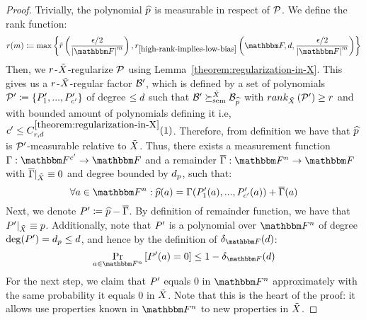 \begin{proof}
    Trivially, the polynomial $\lift{\onvarpoly}$ is measurable in respect of $\genpolyset$.
    \newline
    We define the rank function:
    \[
        \rankfunc(m) \definedas \max \set{
            \rankbiasfunc \parens {\dfrac{\epsilon / 2}{\abs{\basefield}^m}},
            \rankfunc_{\ref{high-rank-implies-low-bias}} \parens{\basefield, \degree, \dfrac{\epsilon / 2}{\abs{\basefield}^m}}}
    \]
    Then, we ${{{r}}}$-${\tilde{X}}$-regularize $\genpolyset$ using Lemma~{\ref{theorem:regularization-in-X}}.
    This gives us a ${{{r}}}$-${\tilde{X}}$-regular factor $\mathcal{B}^\prime$, which is defined by a set of polynomials $\genpolyset^{\prime} \definedas \set{\genpoly^\prime_1,...,\genpoly^\prime_{c^\prime}}$
    of degree $\leq d$ such that $\factor^\prime \relsemrefine{\variety}\factor_{\lift{\onvarpoly}}$ with $\relrank{\variety}{\genpolyset^\prime} \geq \rankfunc$
    and with bounded amount of polynomials defining it i.e,$c^\prime \leq C_{{{{r}}}, d}^{\ref{theorem:regularization-in-X}}(1)$.
    Therefore, from definition we have that $\lift{\onvarpoly}$ is $\genpolyset^\prime$-measurable relative to ${\tilde{X}}$.
    Thus, there exists a measurement function $\funcdef{\Gamma}{\basefield^{c^\prime}}{\basefield}$
    and a remainder $\funcdef{\relativeremainder{\Gamma}}{\field}{\basefield}$ with $\overline{\Gamma}|_{{\tilde{X}}} \equiv 0$
    and degree bounded by $\degree_{\onvarpoly}$, such that:
    \[
        \forall a \in \field:
        \lift{\onvarpoly}(a) =
        \Gamma(\genpoly^\prime_1(a),...,\genpoly^\prime_{c^\prime}(a))
        + \relativeremainder{\Gamma}(a)
    \]
    Next, we denote $\genpoly^\prime \definedas \lift{\onvarpoly} - \relativeremainder{\Gamma}$.
    By definition of remainder function, we have that $\restrictfunc{\genpoly^\prime}{\variety} \equiv \onvarpoly$.
    Additionally, note that $\genpoly^\prime$ is a polynomial over $\field$ of degree $\deg(\genpoly^\prime) = \degree_{\onvarpoly} \leq \degree$,
    and hence by the definition of $\normalizedcodedistance{\basefield}{\degree}$:
    \begin{equation}\label{eq:polynomials-in-fn-are-bounded-away-from-zero-with-high-probability}
    \prex{a \in \field}{\genpoly^\prime(a) = 0} \leq 1 - \normalizedcodedistance{\basefield}{\degree}
    \end{equation}
    For the next step, we claim that $\genpoly^\prime$ equals $0$ in $\field$ approximately with the same probability it equals $0$ in ${\tilde{X}}$.
    Note that this is the heart of the proof: it allows use properties known in $\field$ to new properties in ${\tilde{X}}$.

\end{proof}
